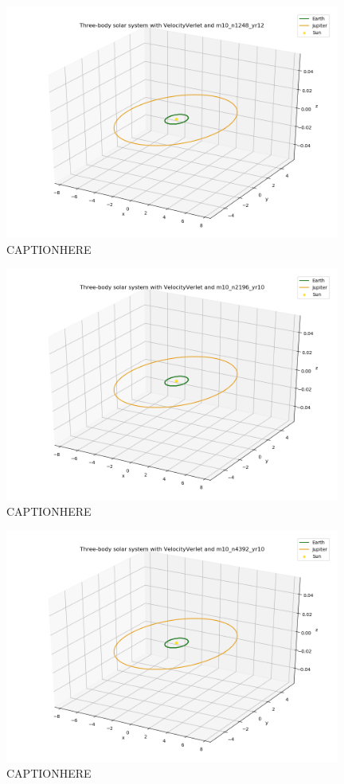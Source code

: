 \documentclass{article}
\begin{document}
    \begin{figure}[H]
        \centering
        \includegraphics[width = 11cm]{img/plot3D_S_E_J_V_m10_n1248_yr12.png}
        \caption{CAPTIONHERE}
        \label{fig:plot3D_S_E_J_V_m10_n1248_yr12}
    \end{figure}

    \begin{figure}[H]
        \centering
        \includegraphics[width = 11cm]{img/plot3D_S_E_J_V_m10_n2196_yr10.png}
        \caption{CAPTIONHERE}
        \label{fig:plot3D_S_E_J_V_m10_n2196_yr10}
    \end{figure}

    \begin{figure}[H]
        \centering
        \includegraphics[width = 11cm]{img/plot3D_S_E_J_V_m10_n4392_yr10.png}
        \caption{CAPTIONHERE}
        \label{fig:plot3D_S_E_J_V_m10_n4392_yr10}
    \end{figure}
\end{document}
